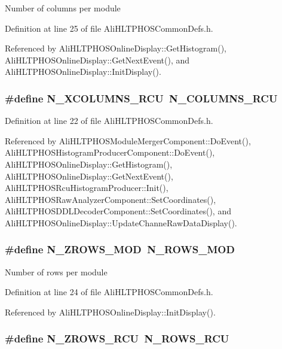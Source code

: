 Number of columns per module 

Definition at line 25 of file Ali\-HLTPHOSCommon\-Defs.h.

Referenced by Ali\-HLTPHOSOnline\-Display::Get\-Histogram(), Ali\-HLTPHOSOnline\-Display::Get\-Next\-Event(), and Ali\-HLTPHOSOnline\-Display::Init\-Display().
\subsubsection{\setlength{\rightskip}{0pt plus 5cm}\#define N\_\-XCOLUMNS\_\-RCU\ N\_\-COLUMNS\_\-RCU}\label{AliHLTPHOSCommonDefs_8h_a14}




Definition at line 22 of file Ali\-HLTPHOSCommon\-Defs.h.

Referenced by Ali\-HLTPHOSModule\-Merger\-Component::Do\-Event(), Ali\-HLTPHOSHistogram\-Producer\-Component::Do\-Event(), Ali\-HLTPHOSOnline\-Display::Get\-Histogram(), Ali\-HLTPHOSOnline\-Display::Get\-Next\-Event(), Ali\-HLTPHOSRcu\-Histogram\-Producer::Init(), Ali\-HLTPHOSRaw\-Analyzer\-Component::Set\-Coordinates(), Ali\-HLTPHOSDDLDecoder\-Component::Set\-Coordinates(), and Ali\-HLTPHOSOnline\-Display::Update\-Channe\-Raw\-Data\-Display().
\subsubsection{\setlength{\rightskip}{0pt plus 5cm}\#define N\_\-ZROWS\_\-MOD\ N\_\-ROWS\_\-MOD}\label{AliHLTPHOSCommonDefs_8h_a15}


Number of rows per module 

Definition at line 24 of file Ali\-HLTPHOSCommon\-Defs.h.

Referenced by Ali\-HLTPHOSOnline\-Display::Init\-Display().
\subsubsection{\setlength{\rightskip}{0pt plus 5cm}\#define N\_\-ZROWS\_\-RCU\ N\_\-ROWS\_\-RCU}\label{AliHLTPHOSCommonDefs_8h_a13}


